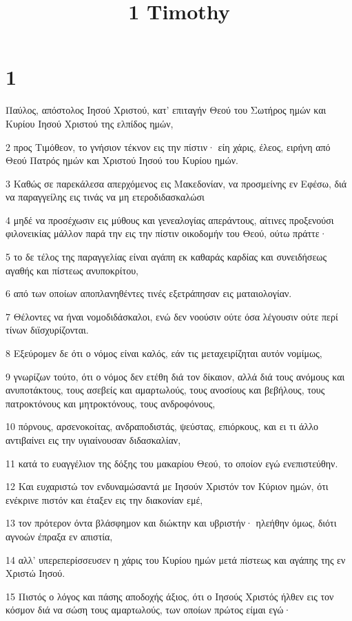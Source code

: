 

\title{1 Timothy}


\chapter{1}

\par Παύλος, απόστολος Ιησού Χριστού, κατ' επιταγήν Θεού του Σωτήρος ημών και Κυρίου Ιησού Χριστού της ελπίδος ημών,
\par 2 προς Τιμόθεον, το γνήσιον τέκνον εις την πίστιν· είη χάρις, έλεος, ειρήνη από Θεού Πατρός ημών και Χριστού Ιησού του Κυρίου ημών.
\par 3 Καθώς σε παρεκάλεσα απερχόμενος εις Μακεδονίαν, να προσμείνης εν Εφέσω, διά να παραγγείλης εις τινάς να μη ετεροδιδασκαλώσι
\par 4 μηδέ να προσέχωσιν εις μύθους και γενεαλογίας απεράντους, αίτινες προξενούσι φιλονεικίας μάλλον παρά την εις την πίστιν οικοδομήν του Θεού, ούτω πράττε·
\par 5 το δε τέλος της παραγγελίας είναι αγάπη εκ καθαράς καρδίας και συνειδήσεως αγαθής και πίστεως ανυποκρίτου,
\par 6 από των οποίων αποπλανηθέντες τινές εξετράπησαν εις ματαιολογίαν.
\par 7 Θέλοντες να ήναι νομοδιδάσκαλοι, ενώ δεν νοούσιν ούτε όσα λέγουσιν ούτε περί τίνων διϊσχυρίζονται.
\par 8 Εξεύρομεν δε ότι ο νόμος είναι καλός, εάν τις μεταχειρίζηται αυτόν νομίμως,
\par 9 γνωρίζων τούτο, ότι ο νόμος δεν ετέθη διά τον δίκαιον, αλλά διά τους ανόμους και ανυποτάκτους, τους ασεβείς και αμαρτωλούς, τους ανοσίους και βεβήλους, τους πατροκτόνους και μητροκτόνους, τους ανδροφόνους,
\par 10 πόρνους, αρσενοκοίτας, ανδραποδιστάς, ψεύστας, επιόρκους, και ει τι άλλο αντιβαίνει εις την υγιαίνουσαν διδασκαλίαν,
\par 11 κατά το ευαγγέλιον της δόξης του μακαρίου Θεού, το οποίον εγώ ενεπιστεύθην.
\par 12 Και ευχαριστώ τον ενδυναμώσαντά με Ιησούν Χριστόν τον Κύριον ημών, ότι ενέκρινε πιστόν και έταξεν εις την διακονίαν εμέ,
\par 13 τον πρότερον όντα βλάσφημον και διώκτην και υβριστήν· ηλεήθην όμως, διότι αγνοών έπραξα εν απιστία,
\par 14 αλλ' υπερεπερίσσευσεν η χάρις του Κυρίου ημών μετά πίστεως και αγάπης της εν Χριστώ Ιησού.
\par 15 Πιστός ο λόγος και πάσης αποδοχής άξιος, ότι ο Ιησούς Χριστός ήλθεν εις τον κόσμον διά να σώση τους αμαρτωλούς, των οποίων πρώτος είμαι εγώ·
